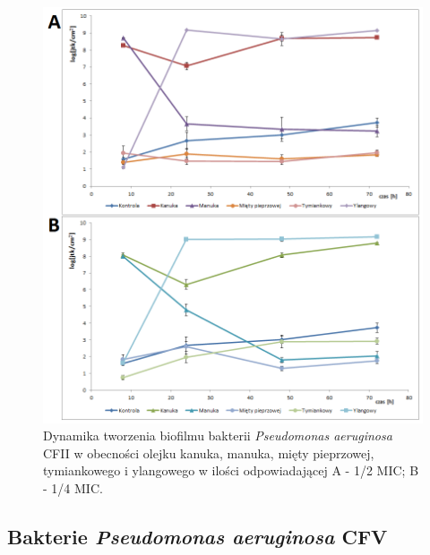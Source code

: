 \documentclass[11pt,a4paper]{report}
\begin{document}
\begin{figure}[!h]
\begin{center}
\includegraphics[scale=0.7]{img/cfii-b.png}
\caption{Dynamika tworzenia biofilmu bakterii \textit{Pseudomonas aeruginosa} CFII w obecności olejku kanuka, manuka, mięty pieprzowej, tymiankowego i ylangowego w ilości odpowiadającej A - 1/2 MIC; B - 1/4 MIC.}\label{cfii-b}
\end{center} 
\end{figure}

\clearpage

\subsection{Bakterie \textit{Pseudomonas aeruginosa} CFV}
\end{document}

